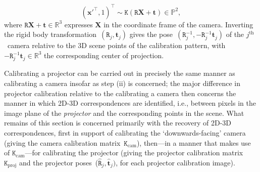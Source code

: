 \documentclass[review]{elsarticle}
\begin{document}
\begin{equation}
(\mathbf{x}'^\top, 1)^\top \sim \mathtt{K}(\mathtt{R}\mathbf{X} + \mathbf{t}) \in \mathbb{P}^2,
\end{equation}
where $\mathtt{R}\mathbf{X} + \mathbf{t} \in \mathbb{R}^3$ expresses $\mathbf{X}$ in the coordinate frame of the camera. Inverting the rigid body transformation~$(\mathtt{R}_j, \mathbf{t}_j)$ gives the pose~$(\mathtt{R}_j^{-1}, -\mathtt{R}_j^{-1}\mathbf{t}_j^{})$ of the $j^{\text{th}}$~camera relative to the 3D scene points of the calibration pattern, with $-\mathtt{R}_j^{-1}\mathbf{t}_j^{} \in \mathbb{R}^3$ the corresponding center of projection.

Calibrating a projector \cite{moreno2012simple,zhang2009projector,zhang2006novel} can be carried out in precisely the same manner as calibrating a camera insofar as step (ii) is concerned; the major difference in projector calibration relative to the calibrating a camera then concerns the manner in which 2D-3D correspondences are identified, i.e., between pixels in the image plane of the \textit{projector} and the corresponding points in the scene. What remains of this section is concerned primarily with the recovery of 2D-3D correspondences, first in support of calibrating the `downwards-facing' camera (giving the camera calibration matrix~$\mathtt{K}_\text{cam}$), then---in a manner that makes use of $\mathtt{K}_\text{cam}$---for calibrating the projector (giving the projector calibration matrix~$\mathtt{K}_\text{proj}$ and the projector poses~($\hat{\mathtt{R}}_j, \hat{\mathbf{t}}_j)$, for each projector calibration image).
\end{document}
